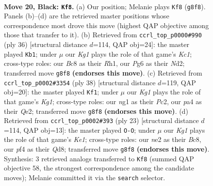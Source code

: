 \documentclass[11pt]{article}
\begin{document}
\begin{figure}[p]
\label{fig:thought-m37}
\end{figure}

\clearpage

\begin{figure}[p]\centering
\begin{subfigure}{0.46\textwidth}\centering
\resizebox{\linewidth}{!}{%
\newchessgame
\chessboard[
  setfen={rnb1r1k1/p2qb2p/1pp3pP/3p1pP1/P2P1P2/1P2P3/4N3/R2QKBNR b KQ - 10 20},
  showmover=false,
  pgfstyle=straightmove, color=movearrow, markmove={g8-f8}
]}
\caption{}
\end{subfigure}\hfill
\begin{subfigure}{0.46\textwidth}\centering
\resizebox{\linewidth}{!}{%
\newchessgame
\chessboard[
  setfen={r1b1r1k1/3nqpp1/2p2n1p/1p2p3/p3P3/2P1QP2/PP1NBBPP/2KR3R w - - 0 19},
  showmover=false,
  pgfstyle=straightmove, color=movearrow, markmove={c1-b1}
]}
\caption{}
\end{subfigure}
\\[4pt]
\begin{subfigure}{0.46\textwidth}\centering
\resizebox{\linewidth}{!}{%
\newchessgame
\chessboard[
  setfen={2k1r2r/ppbn2p1/2pqpn2/3p2p1/6P1/1P1PPN1P/PBP1QRB1/3R2K1 w - - 6 20},
  showmover=false,
  pgfstyle=straightmove, color=movearrow, markmove={g1-f1}
]}
\caption{}
\end{subfigure}\hfill
\begin{subfigure}{0.46\textwidth}\centering
\resizebox{\linewidth}{!}{%
\newchessgame
\chessboard[
  setfen={r1bqk2r/4npb1/pp1p2pp/2p1p2P/P3P3/2NP2P1/1PPN1PB1/R2QK2R b KQkq - 1 12},
  showmover=false,
  pgfstyle=straightmove, color=movearrow, markmove={e8-g8}
]}
\caption{}
\end{subfigure}
\caption{\textbf{Move 20, Black: \texttt{Kf8}.} (a) Our position; Melanie plays \texttt{Kf8} (\texttt{g8f8}). Panels (b)--(d) are the retrieved master positions whose correspondence most drove this move (highest QAP objective among those that transfer to it). (b) Retrieved from \texttt{ccrl\_top\_p0000\#990} (ply 36) [structural distance $d$=114, QAP obj=24]: the master played \texttt{Kb1}; under $\mu$ our \emph{Kg1} plays the role of that game's \emph{Kc1}; cross-type roles: our \emph{B}c8 as their \emph{R}h1, our \emph{P}g6 as their \emph{N}d2; transferred move \texttt{g8f8} \textbf{(endorses this move)}. (c) Retrieved from \texttt{ccrl\_top\_p0002\#3354} (ply 38) [structural distance $d$=119, QAP obj=20]: the master played \texttt{Kf1}; under $\mu$ our \emph{Kg1} plays the role of that game's \emph{Kg1}; cross-type roles: our \emph{n}g1 as their \emph{P}c2, our \emph{p}a4 as their \emph{Q}e2; transferred move \texttt{g8f8} \textbf{(endorses this move)}. (d) Retrieved from \texttt{ccrl\_top\_p0002\#393} (ply 23) [structural distance $d$=114, QAP obj=13]: the master played \texttt{O-O}; under $\mu$ our \emph{Kg1} plays the role of that game's \emph{Ke1}; cross-type roles: our \emph{n}e2 as their \emph{B}c8, our \emph{p}f4 as their \emph{Q}d8; transferred move \texttt{g8f8} \textbf{(endorses this move)}. Synthesis: 3 retrieved analogs transferred to \texttt{Kf8} (summed QAP objective 58, the strongest correspondence among the candidate moves); Melanie committed it via the \texttt{search} selector.}

\end{figure}
\end{document}

